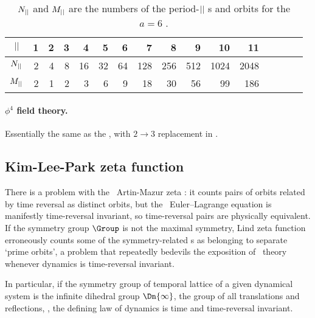 \begin{table}
\begin{tabular}{c|rrrrr|rrrrr|rrrrr}
${||}$ &  1 &  2 &  3 &  4 &  5 &
       6 &  7 &  8 &  9 & 10 &
      11 & \\%
\hline
$N_{||}$ &  2 &  4 &  8 & 16 &  32 &
       64 &  128 &  256 & 512 & 1024 &
      2048 & %
             \rule[-1ex]{0ex}{3.5ex} \\
$M_{||}$ &   2 &   1 &   2 &  3 &  6 &
         9 & 18 &  30 & 56  & 99 &
       186 &  %
\end{tabular}
\bigskip
\caption{\label{tab:LC21HamHenon}
$N_{||}$ and $M_{||}$ are the numbers of
the period-${||}$ {\lattstate}s and
orbits for the ${a}=6$ {\HenonMap}.
}
\end{table}
%

\paragraph{{$\phi^4$} field theory.}
Essentially the same as the \henlatt, with $2\to3$ replacement in
.


\subsection{Kim-Lee-Park zeta function}
\label{sect:KiLePa}

There is a problem with the \templatt\ Artin-Mazur zeta
: it counts pairs of orbits related by time reversal as
distinct orbits, but the \templatt\ Euler–\-Lagrange equation
 is manifestly time-reversal invariant, so
time-reversal pairs are physically equivalent.
If the symmetry group $\Group$ is not the maximal symmetry, Lind zeta
function erroneously counts some of the symmetry-related {\lattstate}s as
belonging to separate `prime orbits', a problem that repeatedly bedevils
the \wwwcb{} exposition of \po\ theory whenever dynamics is time-reversal
invariant.

In particular, if the symmetry group of temporal lattice of a
given dynamical system is the {infinite dihedral group} $\Dn{\infty}$,
the group of all translations and reflections, \ie, the
defining law of dynamics is time and time-reversal invariant.

